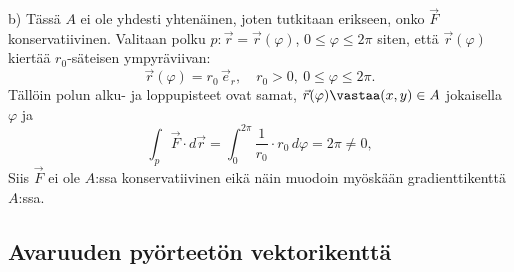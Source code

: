 b) Tässä $A$ ei ole yhdesti yhtenäinen, joten tutkitaan erikseen, onko $\vec F$ 
konservatiivinen. Valitaan polku $p:\vec r=\vec r(\varphi)$, $0\leq\varphi\leq 2\pi$ siten,
että $\vec r(\varphi)$ kiertää $r_0$-säteisen ympyräviivan:
\[
\vec r(\varphi)=r_0\,\vec e_r,\quad r_0>0,\ 0\leq\varphi\leq 2\pi.
\]
Tällöin polun alku- ja loppupisteet ovat samat, $\vec r(\varphi)\vastaa (x,y)\in A$ jokaisella
$\varphi$ ja
\[
\int_p \vec F\cdot d\vec r=\int_0^{2\pi} \frac{1}{r_0}\cdot r_0\,d\varphi=2\pi\neq 0,
\]
Siis $\vec F$ ei ole $A$:ssa konservatiivinen eikä näin muodoin myöskään gradienttikenttä
$A$:ssa. \loppu

\subsection*{Avaruuden pyörteetön vektorikenttä}


